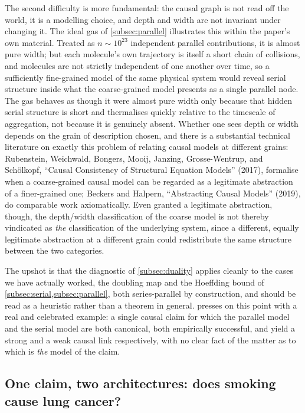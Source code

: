 \documentclass[11pt]{article}
\theoremstyle{definition}
\begin{document}
The second difficulty is more fundamental: the causal graph is not read off the world, it is a modelling choice, and depth and width are not invariant under changing it. The ideal gas of \cref{subsec:parallel} illustrates this within the paper's own material. Treated as $n\sim10^{23}$ independent parallel contributions, it is almost pure width; but each molecule's own trajectory is itself a short chain of collisions, and molecules are not strictly independent of one another over time, so a sufficiently fine-grained model of the same physical system would reveal serial structure inside what the coarse-grained model presents as a single parallel node. The gas behaves as though it were almost pure width only because that hidden serial structure is short and thermalises quickly relative to the timescale of aggregation, not because it is genuinely absent. Whether one sees depth or width depends on the grain of description chosen, and there is a substantial technical literature on exactly this problem of relating causal models at different grains: Rubenstein, Weichwald, Bongers, Mooij, Janzing, Grosse-Wentrup, and Sch\"olkopf, ``Causal Consistency of Structural Equation Models'' (2017), formalise when a coarse-grained causal model can be regarded as a legitimate abstraction of a finer-grained one; Beckers and Halpern, ``Abstracting Causal Models'' (2019), do comparable work axiomatically. Even granted a legitimate abstraction, though, the depth/width classification of the coarse model is not thereby vindicated as \emph{the} classification of the underlying system, since a different, equally legitimate abstraction at a different grain could redistribute the same structure between the two categories.

The upshot is that the diagnostic of \cref{subsec:duality} applies cleanly to the cases we have actually worked, the doubling map and the Hoeffding bound of \cref{subsec:serial,subsec:parallel}, both series-parallel by construction, and should be read as a heuristic rather than a theorem in general.  presses on this point with a real and celebrated example: a single causal claim for which the parallel model and the serial model are both canonical, both empirically successful, and yield a strong and a weak causal link respectively, with no clear fact of the matter as to which is \emph{the} model of the claim.

\subsection{One claim, two architectures: does smoking cause lung cancer?}
\label{subsec:ambiguity}
\end{document}
